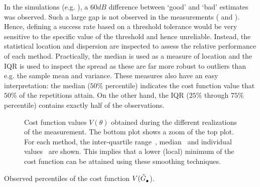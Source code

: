 \begin{remark}
  In the simulations (e.g. ), a $60\unit{dB}$ difference between `good' and `bad' estimates was observed.
  Such a large gap is not observed in the measurements ( and ).
  Hence, defining a success rate based on a threshold tolerance would be very sensitive to the specific value of the threshold and hence unreliable.
  Instead, the statistical location and dispersion are inspected to assess the relative performance of each method.
  Practically, the median is used as a measure of location and the \gls{IQR} is used to inspect the spread as these are far more robust to outliers than e.g. the sample mean and variance.
  These measures also have an easy interpretation: the median ($50\%$ percentile) indicates the cost function value that $50\%$ of the repetitions attain.
  On the other hand, the \gls{IQR} ($25\%$ through $75\%$ percentile) contains  exactly half of the observations.
\end{remark}

\begin{figure}[p]
  \centering
  \setlength{\figurewidth}{0.85\columnwidth}
  \setlength{\figureheight}{0.68\figurewidth}
  \setlength{\figurewidth}{0.75\columnwidth}
  
  \caption[Cost function values over the different measurements.]{Cost function values $V(\theta)$ obtained during the different realizations of the measurement.
  The bottom plot shows a zoom of the top plot.
  For each method, the inter-quartile range~, median~ and individual values~ are shown.
  This implies that a lower (local) minimum of the cost function can be attained using these smoothing techniques.}
  \label{fig:costMeasurements}
\end{figure}

\begin{table}[p]
  \centering
  \caption{Observed percentiles of the cost function $V(\hat{G}_{\mathrm{\bullet}}^{\mathrm{}}$).}
% 
  \label{tbl:costMeasurements}
\end{table}




